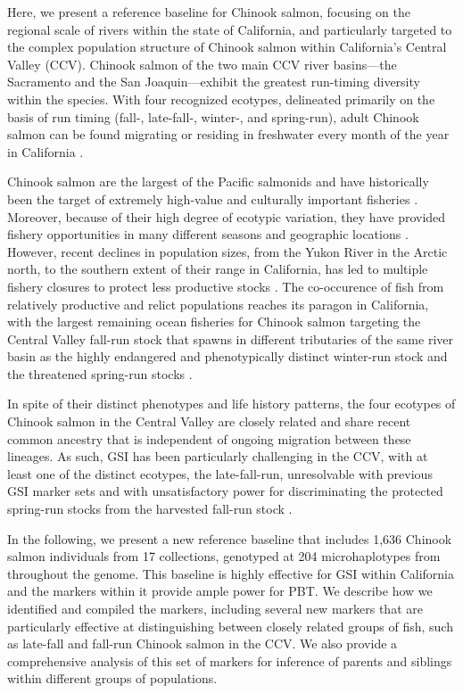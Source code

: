 Here, we present a reference baseline for Chinook salmon, focusing on the regional scale of
rivers within the state of California, and particularly targeted to the complex population
structure of Chinook salmon within California's Central Valley (CCV). Chinook salmon of the two main CCV river basins---the
Sacramento and the San Joaquin---exhibit the greatest run-timing diversity
within the species.  With four recognized ecotypes, delineated primarily on the basis of run timing
(fall-, late-fall-, winter-, and spring-run), adult Chinook salmon can be found migrating or residing
in freshwater every month of the year in California \citep{fisher1994past}.

Chinook salmon are the largest of the Pacific salmonids and have historically been the target of extremely high-value and culturally important
fisheries \citep{myers1998status}. Moreover, because of their high degree of ecotypic variation, they have provided fishery opportunities in many
different seasons and geographic locations \citep{healey1991life}. However, recent declines in population sizes, from the Yukon River in the Arctic north,
to the southern extent of their range in California, has led to multiple fishery closures to protect
less productive stocks \citep{lindley2009caused}. The co-occurence of fish from relatively productive and relict populations reaches its paragon in California,
with the largest remaining ocean fisheries for Chinook salmon targeting the Central Valley fall-run stock that spawns in different tributaries of the
same river basin as the highly endangered and phenotypically distinct winter-run stock and the threatened spring-run stocks \citep{satterthwaite2015stock}.

In spite of their distinct phenotypes and life history patterns, the four ecotypes of Chinook salmon in the Central Valley are closely related
\citep{clemento2014evaluation} and share recent common ancestry that is independent of ongoing migration between these lineages. As such, GSI
has been particularly challenging in the CCV, with at least one of the distinct ecotypes, the late-fall-run, unresolvable with previous GSI marker sets
and with unsatisfactory power for discriminating the protected spring-run stocks from the
harvested fall-run stock \citep{seeb2007development,clemento2014evaluation}.

In the following, we present a new reference baseline that includes 1,636 Chinook salmon individuals
from 17 collections, genotyped at 204 microhaplotypes \citep{baetscher2018microhaplotypes} from throughout the genome.
This baseline is
highly effective for GSI within California and the markers within it provide ample power
for PBT.
We describe how we identified and compiled the markers, including several new markers
that are particularly effective at distinguishing between closely related groups of fish,
such as late-fall and fall-run Chinook salmon in the CCV.  We also provide a comprehensive analysis of this
set of markers for inference of parents and siblings within different groups of populations.



